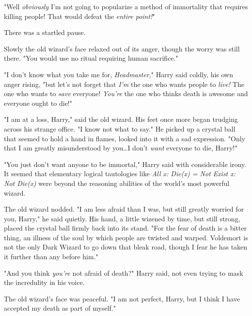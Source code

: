"Well \emph{obviously} I’m not going to popularize a method of immortality that
requires killing people! That would defeat the \emph{entire point!}"

There was a startled pause.

Slowly the old wizard’s face relaxed out of its anger, though the worry was
still there. "You would use no ritual requiring human sacrifice."

"I don’t know what you take me for, \emph{Headmaster,}" Harry said coldly, his
own anger rising, "but let’s not forget that \emph{I’m} the one who wants
people to \emph{live!} The one who wants to \emph{save} everyone! \emph{You’re}
the one who thinks death is awesome and everyone ought to die!"

"I am at a loss, Harry," said the old wizard. His feet once more began trudging
across his strange office. "I know not what to say." He picked up a crystal
ball that seemed to hold a hand in flames, looked into it with a sad
expression. "Only that I am greatly misunderstood by you…I don’t
\emph{want} everyone to die, Harry!"

"You just don’t want anyone to be immortal," Harry said with considerable
irony. It seemed that elementary logical tautologies like \emph{All x: Die(x) =
Not Exist x: Not Die(x)} were beyond the reasoning abilities of the world’s
most powerful wizard.

The old wizard nodded. "I am less afraid than I was, but still greatly worried
for you, Harry," he said quietly. His hand, a little wizened by time, but still
strong, placed the crystal ball firmly back into its stand. "For the fear of
death is a bitter thing, an illness of the soul by which people are twisted and
warped. Voldemort is not the only Dark Wizard to go down that bleak road,
though I fear he has taken it further than any before him."

"And you think \emph{you’re} not afraid of death?" Harry said, not even trying
to mask the incredulity in his voice.

The old wizard’s face was peaceful. "I am not perfect, Harry, but I think I
have accepted my death as part of myself."

